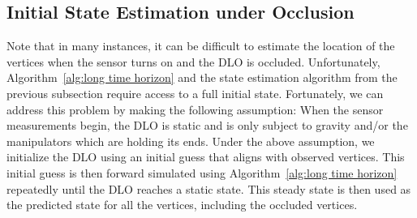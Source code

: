 

\subsection{Initial State Estimation under Occlusion}
\label{sec:initial_state}
Note that in many instances, it can be difficult to estimate the location of the vertices when the sensor turns on and the DLO is occluded.
Unfortunately, Algorithm~\ref{alg:long time horizon} and the state estimation algorithm from the previous subsection require access to a full initial state.
Fortunately, we can address this problem by making the following assumption: When the sensor measurements begin, the DLO is static and is only subject to gravity and/or the manipulators which are holding its ends.
Under the above assumption, we initialize the DLO using an initial guess that aligns with observed vertices.
This initial guess is then forward simulated using Algorithm~\ref{alg:long time horizon} repeatedly until the DLO reaches a static state.
This steady state is then used as the predicted state for all the vertices, including the occluded vertices. 

